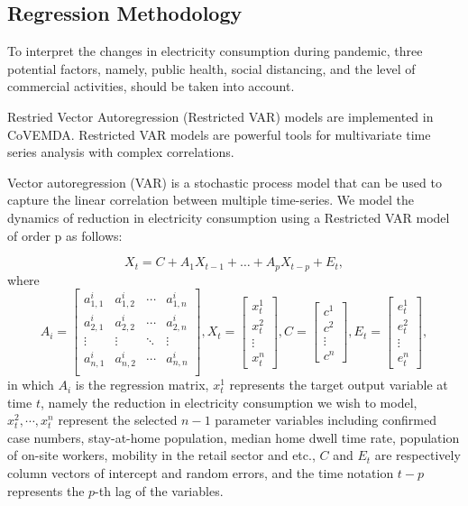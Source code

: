 \documentclass[10pt]{article}
\newcommand{\covemda}{CoVEMDA}
\numberwithin{equation}{section}
\numberwithin{table}{section}
\numberwithin{figure}{section}
\begin{document}
\subsection{Regression Methodology}
To interpret the changes in electricity consumption during pandemic, three potential factors, namely, public health, social distancing, and the level of commercial activities, should be taken into account. 

Restried Vector Autoregression (Restricted VAR) models are implemented in \covemda. Restricted VAR models are powerful tools for multivariate time series analysis with complex correlations.

Vector autoregression (VAR)\cite{var} is a stochastic process model that can be used to capture the linear correlation between multiple time-series. We model the dynamics of reduction in electricity consumption using a Restricted VAR model of order p as follows:

\begin{equation}
  X_t=C+A_1X_{t-1}+\dots+A_pX_{t-p}+E_t,
\end{equation}
where
\begin{equation}
  A_i=
  \begin{bmatrix}
  a_{1,1}^i & a_{1,2}^i & \cdots & a_{1,n}^i\\
  a_{2,1}^i & a_{2,2}^i & \cdots & a_{2,n}^i\\
  \vdots & \vdots & \ddots & \vdots \\
  a_{n,1}^i & a_{n,2}^i & \cdots & a_{n,n}^i\\
  \end{bmatrix}
  ,X_t=
  \begin{bmatrix}
    x_t^1\\x_t^2\\\vdots\\x_t^n
  \end{bmatrix},
  C=
  \begin{bmatrix}
    c^1\\c^2\\\vdots\\c^n
  \end{bmatrix},
  E_t=
  \begin{bmatrix}
    e_t^1\\e_t^2\\\vdots\\e_t^n
  \end{bmatrix},
\end{equation}
in which $A_i$ is the regression matrix, $x_t^1$ represents the target output variable at time $t$, namely the reduction in electricity consumption we wish to model, $x_t^2,\cdots,x_t^n$ represent the selected $n-1$ parameter variables including confirmed case numbers, stay-at-home population, median home dwell time rate, population of on-site workers, mobility in the retail sector and etc., $C$ and $E_t$ are respectively column vectors of intercept and random errors, and the time notation $t-p$ represents the $p$-th lag of the variables.
\end{document}
